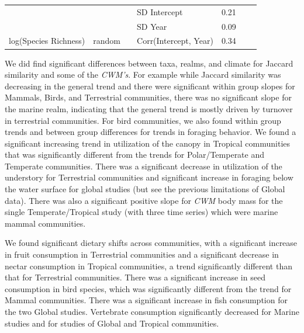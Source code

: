 \documentclass{article}
\begin{document}
\begin{table}[!h]
{\begin{tabular}[t]{l|l|>{\raggedright\arraybackslash}p{2cm}|l|r|r|l}
\cline{3-7}
 &  &  & SD Intercept & 0.21 &  & \\
\cline{4-7}
 &  &  & SD Year & 0.09 &  & \\
\cline{4-7}
\multirow{-8}{*}{\raggedright\arraybackslash log(Species Richness)} & \multirow{-6}{*}{\raggedright\arraybackslash random} & \multirow{-3}{2cm}{\raggedright\arraybackslash time series within study} & Corr(Intercept, Year) & 0.34 &  & \\
\hline
\end{tabular}}
\end{table}

We did find significant differences between taxa, realms, and climate
for Jaccard similarity and some of the \emph{CWM's}. For example while
Jaccard similarity was decreasing in the general trend and there were
significant within group slopes for Mammals, Birds, and Terrestrial
communities, there was no significant slope for the marine realm,
indicating that the general trend is mostly driven by turnover in
terrestrial communities. For bird communities, we also found within
group trends and between group differences for trends in foraging
behavior. We found a significant increasing trend in utilization of the
canopy in Tropical communities that was significantly different from the
trends for Polar/Temperate and Temperate communities. There was a
significant decrease in utilization of the understory for Terrestrial
communities and significant increase in foraging below the water surface
for global studies (but see the previous limitations of Global data).
There was also a significant positive slope for \emph{CWM} body mass for
the single Temperate/Tropical study (with three time series) which were
marine mammal communities.

We found significant dietary shifts across communities, with a
significant increase in fruit consumption in Terrestrial communities and
a significant decrease in nectar consumption in Tropical communities, a
trend significantly different than that for Terrestrial communities.
There was a significant increase in seed consumption in bird species,
which was significantly different from the trend for Mammal communities.
There was a significant increase in fish consumption for the two Global
studies. Vertebrate consumption significantly decreased for Marine
studies and for studies of Global and Tropical communities.
\end{document}
